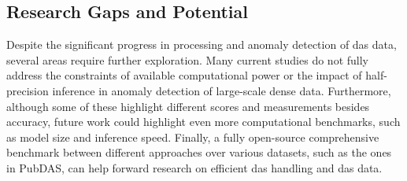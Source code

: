 \subsection{Research Gaps and Potential}
Despite the significant progress in processing and anomaly detection of \acrshort{das} data, several areas require further exploration. Many current studies do not fully address the constraints of available computational power or the impact of half-precision inference in anomaly detection of large-scale dense data. Furthermore, although some of these highlight different scores and measurements besides accuracy, future work could highlight even more computational benchmarks, such as model size and inference speed. Finally, a fully open-source comprehensive benchmark between different approaches over various datasets, such as the ones in PubDAS, can help forward research on efficient \acrshort{das} handling and \acrshort{das} data.






